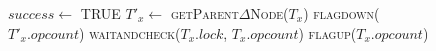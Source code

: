 \begin{figure}
\centering
\begin{algorithmic} [1]                   
\small

\State $success \gets$ TRUE
       				                                     	                      
   \State  $T'_x \gets$ \textsc{getParent$\Delta$Node}($T_x$)	 
   \State  \textsc{flagdown}($T'_x.opcount$) 				
   \State  \textsc{waitandcheck}($T_x.lock$, $T_x.opcount$)
	\State  \textsc{flagup}($T_x.opcount$)
\EndIf
  
 


\end{algorithmic}
\end{figure}
